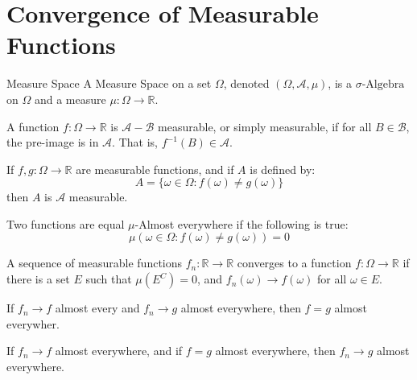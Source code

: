 \documentclass[crop=false,class=book,oneside]{standalone}                      %
\begin{document}
    \section{Convergence of Measurable Functions}
        \begin{ldefinition}{Measure Space}
            A Measure Space on a set $\Omega$, denoted
            $(\Omega,\mathcal{A},\mu)$, is a
            $\sigma\textrm{-Algebra}$ on $\Omega$ and a
            measure $\mu:\Omega\rightarrow\mathbb{R}$.
        \end{ldefinition}
        A function $f:\Omega\rightarrow\mathbb{R}$ is
        $\mathcal{A}-\mathcal{B}$ measurable, or simply
        measurable, if for all $B\in\mathcal{B}$, the
        pre-image is in $\mathcal{A}$. That is,
        $f^{-1}(B)\in\mathcal{A}$.
        \begin{theorem}
            If $f,g:\Omega\rightarrow\mathbb{R}$ are
            measurable functions, and if $A$ is defined by:
            \begin{equation}
                A=\{\omega\in\Omega:f(\omega)\ne{g}(\omega)\}
            \end{equation}
            then $A$ is $\mathcal{A}$ measurable.
        \end{theorem}
        \begin{definition}
            Two functions are equal $\mu$-Almost everywhere
            if the following is true:
            \begin{equation}
                \mu(\omega\in\Omega:f(\omega)\ne{g}(\omega))
                =0
            \end{equation}
        \end{definition}
        \begin{definition}
            A sequence of measurable functions
            $f_{n}:\mathbb{R}\rightarrow\mathbb{R}$ converges
            to a function $f:\Omega\rightarrow\mathbb{R}$
            if there is a set $E$ such that $\mu(E^{C})=0$,
            and $f_{n}(\omega)\rightarrow{f}(\omega)$ for all
            $\omega\in{E}$.
        \end{definition}
        \begin{theorem}
            If $f_{n}\rightarrow{f}$ almost every and
            $f_{n}\rightarrow{g}$ almost everywhere, then
            $f=g$ almost everywher.
        \end{theorem}
        \begin{theorem}
            If $f_{n}\rightarrow{f}$ almost everywhere, and
            if $f=g$ almost everywhere, then
            $f_{n}\rightarrow{g}$ almost everywhere.
        \end{theorem}
\end{document}
